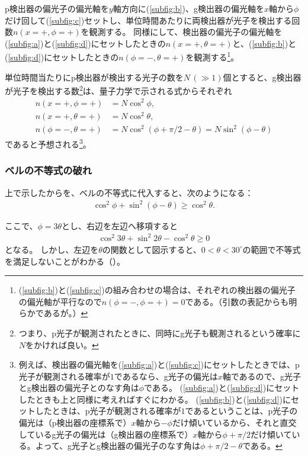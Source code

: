 \documentclass[10pt,b5paper,papersize,dvipdfmx]{jsbook}
\begin{document}
p検出器の偏光子の偏光軸を$y$軸方向に(\ref{subfig:b})、g検出器の偏光軸を$x$軸から$\phi$だけ回して(\ref{subfig:c})セットし、単位時間あたりに両検出器が光子を検出する回数$n(x=+,\phi=+)$を観測する。
同様にして、検出器の偏光子の偏光軸を(\ref{subfig:a})と(\ref{subfig:d})にセットしたときの$n(x=+,\theta=+)$と、(\ref{subfig:b})と(\ref{subfig:d})にセットしたときの$n(\phi=-,\theta=+)$を観測する\footnote{
  (\ref{subfig:b})と(\ref{subfig:c})の組み合わせの場合は、それぞれの検出器の偏光子の偏光軸が平行なので$n(\phi=-, \phi=+) = 0$である。（引数の表記からも明らかであるが。）
}。\par
単位時間当たりにp検出器が検出する光子の数を$N \,(\gg 1)$個とすると、g検出器が光子を検出する数\footnote{
  つまり、p光子が観測されたときに、同時にg光子も観測されるという確率に$N$をかければ良い。
}は、量子力学で示される式からそれぞれ
\begin{align}
  \label{eq:photon-1} n(x=+,\phi=+)      &= N \cos^2\phi, \\
  \label{eq:photon-2} n(x=+,\theta=+)    &= N \cos^2\theta, \\
  \label{eq:photon-3} n(\phi=-,\theta=+) &= N \cos^2(\phi + \pi/2 - \theta) = N \sin^2(\phi - \theta)
\end{align}
であると予想される\footnote{
  例えば、検出器の偏光軸を(\ref{subfig:a})と(\ref{subfig:c})にセットしたときでは、p光子が観測される確率が$1$であるなら、g光子の偏光は$x$軸であるので、g光子とg検出器の偏光子とのなす角は$\phi$である。
  (\ref{subfig:a})と(\ref{subfig:d})にセットしたときも上と同様に考えればすぐにわかる。
  (\ref{subfig:b})と(\ref{subfig:d})にセットしたときは、p光子が観測される確率が$1$であるということは、p光子の偏光は（p検出器の座標系で）$x$軸から$-\phi$だけ傾いているから、それと直交しているg光子の偏光は（g検出器の座標系で）$x$軸から$\phi + \pi/2$だけ傾いている。よって、g光子とg検出器の偏光子のなす角は$\phi + \pi/2 - \theta$である。
}。

%
\subsubsection{ベルの不等式の破れ} %

上で示したからを、ベルの不等式に代入すると、次のようになる：
\begin{align*}
  \cos^2\phi + \sin^2(\phi - \theta) \ge \cos^2\theta.
\end{align*}

ここで、$\phi = 3\theta$とし、右辺を左辺へ移項すると
\begin{align}
  \cos^2 3\theta + \sin^2 2\theta - \cos^2\theta \ge 0
\end{align}
となる。
しかし、左辺を$\theta$の関数として図示すると、$0 < \theta < 30^\circ$の範囲で不等式を満足しないことがわかる（）。
\end{document}
